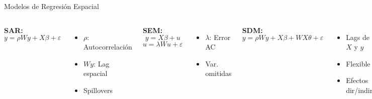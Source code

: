 \documentclass[10pt,aspectratio=169]{beamer}
\begin{document}
\begin{frame}{Modelos de Regresión Espacial}
    \begin{columns}[T]
        \textbf{SAR:}
        $$y = \rho Wy + X\beta + \varepsilon$$
        
        \begin{itemize}
            \item $\rho$: Autocorrelación
            \item $Wy$: Lag espacial
            \item Spillovers
        \end{itemize}
        
        \vspace{0.3cm}
        \textbf{SEM:}
        $$y = X\beta + u$$
        $$u = \lambda Wu + \varepsilon$$
        
        \begin{itemize}
            \item $\lambda$: Error AC
            \item Var. omitidas
        \end{itemize}
        
        \textbf{SDM:}
        $$y = \rho Wy + X\beta + WX\theta + \varepsilon$$
        
        \begin{itemize}
            \item Lags de $X$ y $y$
            \item Flexible
            \item Efectos dir/indir
        \end{itemize}
        
        \vspace{0.3cm}
        \textbf{Selección:}
        \begin{enumerate}
            \item Moran's I
            \item Tests LM
            \item AIC/BIC
            \item Especificación
        \end{enumerate}
    \end{columns}
\end{frame}
\end{document}
